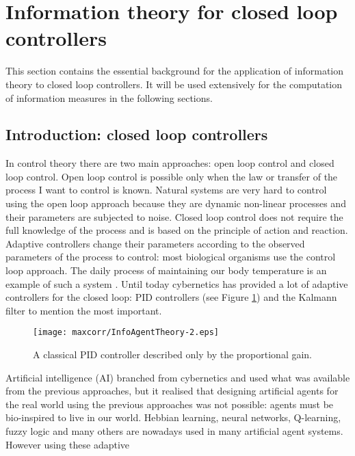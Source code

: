 
\section{Information theory for closed loop controllers \label{Introduction:InfoTheoryClosedLoop}}

This section contains the essential background for the application of information
theory to closed loop controllers.
It will be used extensively for the computation of information measures in the 
following sections.

\subsection{Introduction: closed loop controllers}
In control theory there are two main approaches: open loop control and closed
loop control. Open loop control is possible only when the law or transfer of the
 process I want to control is known. Natural systems are very hard to control
using the open loop approach because they are dynamic non-linear processes and
their parameters are subjected to noise. Closed loop control does not require
the full knowledge of the process and is based on the principle of action and reaction.
Adaptive controllers change their parameters according to the observed parameters of
the process to control: most biological organisms use the control loop approach.
The daily process of maintaining our body temperature is an example of such a system \citep{HumanBody}.
Until today cybernetics has provided a lot of adaptive controllers for the closed loop:
PID controllers
(see Figure \ref{Figure:maxcorr:PID}) and the Kalmann filter to mention the most important.
\begin{figure}[ht]
  \begin{center}
    \texttt{[image: maxcorr/InfoAgentTheory-2.eps]}
    \caption[Classical PID controller]{
	     A classical PID controller described only by the proportional gain.
	      \label{Figure:maxcorr:PID}}
  \end{center}
\end{figure}
Artificial intelligence (AI) branched from cybernetics and used what was available
from the previous approaches, but it realised that designing artificial agents
for the real world using the previous
approaches was not possible: agents must be bio-inspired to live in our world.
Hebbian learning, neural networks, Q-learning, fuzzy logic and many others are
nowadays used in many artificial agent systems. However using these adaptive
